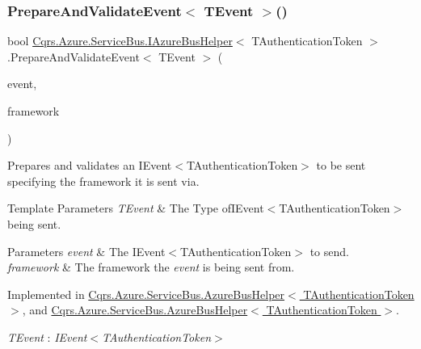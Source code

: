 \subsubsection{\texorpdfstring{Prepare\+And\+Validate\+Event$<$ T\+Event $>$()}{PrepareAndValidateEvent< TEvent >()}}
{\footnotesize\ttfamily bool \hyperlink{interfaceCqrs_1_1Azure_1_1ServiceBus_1_1IAzureBusHelper}{Cqrs.\+Azure.\+Service\+Bus.\+I\+Azure\+Bus\+Helper}$<$ T\+Authentication\+Token $>$.Prepare\+And\+Validate\+Event$<$ T\+Event $>$ (\begin{DoxyParamCaption}\item[{T\+Event @}]{event,  }\item[{string}]{framework }\end{DoxyParamCaption})}



Prepares and validates an I\+Event$<$\+T\+Authentication\+Token$>$ to be sent specifying the framework it is sent via. 


\begin{DoxyTemplParams}{Template Parameters}
{\em T\+Event} & The Type ofI\+Event$<$\+T\+Authentication\+Token$>$ being sent.\\
\hline
\end{DoxyTemplParams}

\begin{DoxyParams}{Parameters}
{\em event} & The I\+Event$<$\+T\+Authentication\+Token$>$ to send.\\
\hline
{\em framework} & The framework the {\itshape event}  is being sent from.\\
\hline
\end{DoxyParams}


Implemented in \hyperlink{classCqrs_1_1Azure_1_1ServiceBus_1_1AzureBusHelper_ab0f6ff2ee04ad3b58e6713caebd3b560_ab0f6ff2ee04ad3b58e6713caebd3b560}{Cqrs.\+Azure.\+Service\+Bus.\+Azure\+Bus\+Helper$<$ T\+Authentication\+Token $>$}, and \hyperlink{classCqrs_1_1Azure_1_1ServiceBus_1_1AzureBusHelper_ab0f6ff2ee04ad3b58e6713caebd3b560_ab0f6ff2ee04ad3b58e6713caebd3b560}{Cqrs.\+Azure.\+Service\+Bus.\+Azure\+Bus\+Helper$<$ T\+Authentication\+Token $>$}.

\begin{Desc}
\item[Type Constraints]\begin{description}
\item[{\em T\+Event} : {\em I\+Event$<$T\+Authentication\+Token$>$}]\end{description}
\end{Desc}
\mbox{\label{interfaceCqrs_1_1Azure_1_1ServiceBus_1_1IAzureBusHelper_ad25c4130a4357504cfccba49999493c7_ad25c4130a4357504cfccba49999493c7}} 
